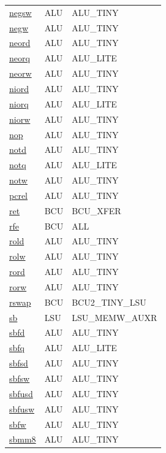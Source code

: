 \begin{small}
\begin{longtable}[l]{l l l}
\hyperlink{lvx.negsw}{negsw} & ALU & ALU\_TINY \\ 
\hyperlink{lvx.negw}{negw} & ALU & ALU\_TINY \\ 
\hyperlink{lvx.neord}{neord} & ALU & ALU\_TINY \\ 
\hyperlink{lvx.neorq}{neorq} & ALU & ALU\_LITE \\ 
\hyperlink{lvx.neorw}{neorw} & ALU & ALU\_TINY \\ 
\hyperlink{lvx.niord}{niord} & ALU & ALU\_TINY \\ 
\hyperlink{lvx.niorq}{niorq} & ALU & ALU\_LITE \\ 
\hyperlink{lvx.niorw}{niorw} & ALU & ALU\_TINY \\ 
\hyperlink{lvx.nop}{nop} & ALU & ALU\_TINY \\ 
\hyperlink{lvx.notd}{notd} & ALU & ALU\_TINY \\ 
\hyperlink{lvx.notq}{notq} & ALU & ALU\_LITE \\ 
\hyperlink{lvx.notw}{notw} & ALU & ALU\_TINY \\ 
\hyperlink{lvx.pcrel}{pcrel} & ALU & ALU\_TINY \\ 
\hyperlink{lvx.ret}{ret} & BCU & BCU\_XFER \\ 
\hyperlink{lvx.rfe}{rfe} & BCU & ALL \\ 
\hyperlink{lvx.rold}{rold} & ALU & ALU\_TINY \\ 
\hyperlink{lvx.rolw}{rolw} & ALU & ALU\_TINY \\ 
\hyperlink{lvx.rord}{rord} & ALU & ALU\_TINY \\ 
\hyperlink{lvx.rorw}{rorw} & ALU & ALU\_TINY \\ 
\hyperlink{lvx.rswap}{rswap} & BCU & BCU2\_TINY\_LSU \\ 
\hyperlink{lvx.sb}{sb} & LSU & LSU\_MEMW\_AUXR \\ 
\hyperlink{lvx.sbfd}{sbfd} & ALU & ALU\_TINY \\ 
\hyperlink{lvx.sbfq}{sbfq} & ALU & ALU\_LITE \\ 
\hyperlink{lvx.sbfsd}{sbfsd} & ALU & ALU\_TINY \\ 
\hyperlink{lvx.sbfsw}{sbfsw} & ALU & ALU\_TINY \\ 
\hyperlink{lvx.sbfusd}{sbfusd} & ALU & ALU\_TINY \\ 
\hyperlink{lvx.sbfusw}{sbfusw} & ALU & ALU\_TINY \\ 
\hyperlink{lvx.sbfw}{sbfw} & ALU & ALU\_TINY \\ 
\hyperlink{lvx.sbmm8}{sbmm8} & ALU & ALU\_TINY \\ 

\end{longtable}
\end{small}
